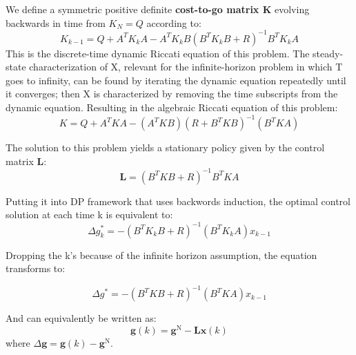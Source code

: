 \documentclass[11pt]{article}
\begin{document}
We define a symmetric positive definite \textbf{cost-to-go matrix K} evolving backwards in time from $K _ { N } = Q$ according to:
\begin{equation} 
K _ { k - 1 } = Q + A ^ { T } K_ { k } A - A ^ { T } K _ { k } B \left( B ^ { T } K_ { k } B + R \right) ^ { - 1 } B ^ { T } K _ { k } A
\end{equation}
This is the discrete-time dynamic Riccati equation of this problem. The steady-state characterization of X, relevant for the infinite-horizon problem in which T goes to infinity, can be found by iterating the dynamic equation repeatedly until it converges; then X is characterized by removing the time subscripts from the dynamic equation. Resulting in the algebraic Riccati equation of this problem:
\begin{equation}
K = Q+ A ^ { T } K A - \left( A ^ { T } K B \right) \left( R + B ^ { T } K B \right) ^ { - 1 } \left( B ^ { T } K A \right)
\end{equation}

The solution to this problem yields a stationary policy given by the control matrix $\mathbf{L}$:
\begin{equation}
\mathbf{L} = \left(B ^ { T } K B +R \right) ^ { - 1 } B ^ { T } K A %
\end{equation}

Putting it into DP framework that uses backwords induction, the optimal control solution at each time k is equivalent to:
\begin{equation} 
\Delta g _ { k } ^ { * } = - \left( B ^ { T } K _ { k } B + R \right) ^ { - 1 } \left( B ^ { T } K_ { k } A \right) x _ { k - 1 }
\end{equation}

Dropping the k's because of the infinite horizon assumption, the equation transforms to:

\begin{equation} 
\Delta g  ^ { * } = - \left( B ^ { T } K  B + R \right) ^ { - 1 } \left( B ^ { T } K  A \right) x _ { k - 1 }
\end{equation}

And can equivalently be written as:
\begin{equation} 
\mathbf { g } ( k ) = \mathbf { g } ^ { \mathrm { N } } - \mathbf { L } \mathbf { x } ( k )
\end{equation}
where $\Delta \mathbf {g } = \mathbf { g } ( k ) - \mathbf {g } ^ { \mathrm { N } }$.\\
\end{document}
